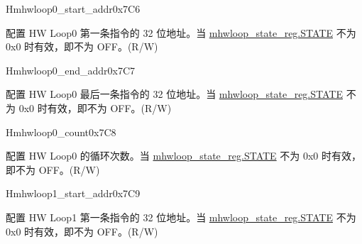 \begin{register}{H}{mhwloop0\_start\_addr}{0x7C6}\label{regdesc:MHWLOOP0_START_ADDR}
%
\regnewline%
\begin{regdesc}\begin{reglist}
\label{fielddesc:HWLP0_SA}\item [SA] 配置 HW Loop0 第一条指令的 32 位地址。当 \hyperref[fielddesc:HWSTATE]{mhwloop\_state\_reg.STATE} 不为 0x0 时有效，即不为 OFF。(R/W)
\end{reglist}\end{regdesc}
\end{register}

\begin{register}{H}{mhwloop0\_end\_addr}{0x7C7}\label{regdesc:MHWLOOP0_END_ADDR}
%
\regnewline%
\begin{regdesc}\begin{reglist}
\label{fielddesc:HWLP0_EA}\item [EA] 配置 HW Loop0 最后一条指令的 32 位地址。当 \hyperref[fielddesc:HWSTATE]{mhwloop\_state\_reg.STATE} 不为 0x0 时有效，即不为 OFF。(R/W)
\end{reglist}\end{regdesc}
\end{register}

\begin{register}{H}{mhwloop0\_count}{0x7C8}\label{regdesc:MHWLOOP0_COUNT}
%
%
\regnewline%
\begin{regdesc}\begin{reglist}
\label{fielddesc:HWLP0_CNT}\item [COUNT] 配置 HW Loop0 的循环次数。当 \hyperref[fielddesc:HWSTATE]{mhwloop\_state\_reg.STATE} 不为 0x0 时有效，即不为 OFF。(R/W)
\end{reglist}\end{regdesc}
\end{register}

\begin{register}{H}{mhwloop1\_start\_addr}{0x7C9}\label{regdesc:MHWLOOP1_START_ADDR}
%
\regnewline%
\begin{regdesc}\begin{reglist}
\label{fielddesc:HWLP1_SA}\item [SA] 配置 HW Loop1 第一条指令的 32 位地址。当 \hyperref[fielddesc:HWSTATE]{mhwloop\_state\_reg.STATE} 不为 0x0 时有效，即不为 OFF。(R/W)
\end{reglist}\end{regdesc}
\end{register}

